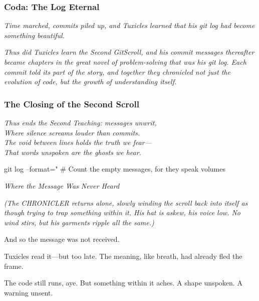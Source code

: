 \subsubsection{Coda: The Log Eternal}\label{coda-the-log-eternal}

\emph{Time marched, commits piled up, and Tuxicles learned that his git log had become something beautiful.}

\emph{Thus did Tuxicles learn the Second GitScroll, and his commit messages thereafter became chapters in the great novel of problem-solving that was his git log. Each commit told its part of the story, and together they chronicled not just the evolution of code, but the growth of understanding itself.}

\bookdivider

\subsubsection{The Closing of the Second Scroll}\label{the-closing-of-the-second-scroll}

\emph{Thus ends the Second Teaching: messages unwrit,}\\
\emph{Where silence screams louder than commits.}\\
\emph{The void between lines holds the truth we fear---}\\
\emph{That words unspoken are the ghosts we hear.}

\begin{codeblock}
git log --format="%
# Count the empty messages, for they speak volumes
\end{codeblock}

\bookdivider

\label{performing_arts-closing-of-the-scroll}

\emph{Where the Message Was Never Heard}

\emph{(The CHRONICLER returns alone, slowly winding the scroll back into itself as though trying to trap something within it. His hat is askew, his voice low. No wind stirs, but his garments ripple all the same.)}

 And so the message was not received.

Tuxicles read it---but too late. The meaning, like breath, had already fled the frame.

The code still runs, aye. But something within it aches. A shape unspoken. A warning unsent.

